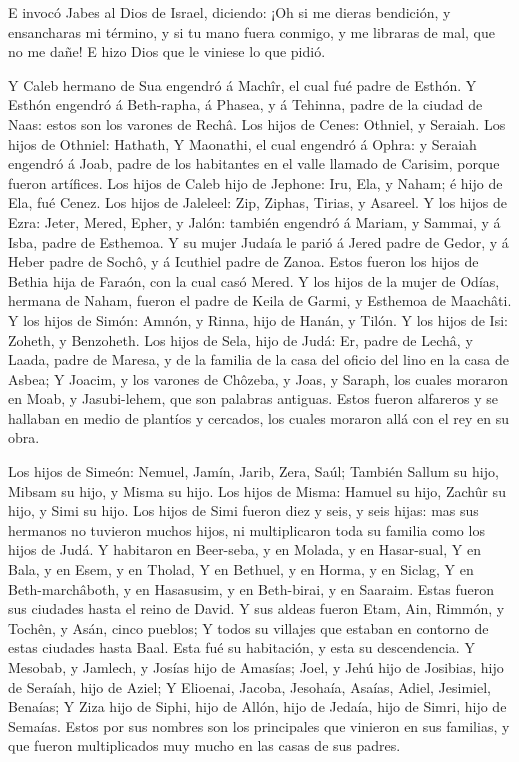  E invocó Jabes al Dios de Israel, diciendo: ¡Oh si me
dieras bendición, y ensancharas mi término, y si tu mano fuera conmigo,
y me libraras de mal, que no me dañe! E hizo Dios que le viniese lo que
pidió.

 Y Caleb hermano de Sua engendró á Machîr, el cual fué
padre de Esthón.  Y Esthón engendró á Beth-rapha, á Phasea,
y á Tehinna, padre de la ciudad de Naas: estos son los varones de Rechâ.
 Los hijos de Cenes: Othniel, y Seraiah. Los hijos de
Othniel: Hathath,  Y Maonathi, el cual engendró á Ophra: y
Seraiah engendró á Joab, padre de los habitantes en el valle llamado de
Carisim, porque fueron artífices.  Los hijos de Caleb hijo
de Jephone: Iru, Ela, y Naham; é hijo de Ela, fué Cenez. 
Los hijos de Jaleleel: Zip, Ziphas, Tirias, y Asareel.  Y
los hijos de Ezra: Jeter, Mered, Epher, y Jalón: también engendró á
Mariam, y Sammai, y á Isba, padre de Esthemoa.  Y su mujer
Judaía le parió á Jered padre de Gedor, y á Heber padre de Sochô, y á
Icuthiel padre de Zanoa. Estos fueron los hijos de Bethia hija de
Faraón, con la cual casó Mered.  Y los hijos de la mujer de
Odías, hermana de Naham, fueron el padre de Keila de Garmi, y Esthemoa
de Maachâti.  Y los hijos de Simón: Amnón, y Rinna, hijo de
Hanán, y Tilón. Y los hijos de Isi: Zoheth, y Benzoheth. 
Los hijos de Sela, hijo de Judá: Er, padre de Lechâ, y Laada, padre de
Maresa, y de la familia de la casa del oficio del lino en la casa de
Asbea;  Y Joacim, y los varones de Chôzeba, y Joas, y
Saraph, los cuales moraron en Moab, y Jasubi-lehem, que son palabras
antiguas.  Estos fueron alfareros y se hallaban en medio de
plantíos y cercados, los cuales moraron allá con el rey en su obra.

 Los hijos de Simeón: Nemuel, Jamín, Jarib, Zera, Saúl;
 También Sallum su hijo, Mibsam su hijo, y Misma su hijo.
 Los hijos de Misma: Hamuel su hijo, Zachûr su hijo, y Simi
su hijo.  Los hijos de Simi fueron diez y seis, y seis
hijas: mas sus hermanos no tuvieron muchos hijos, ni multiplicaron toda
su familia como los hijos de Judá.  Y habitaron en
Beer-seba, y en Molada, y en Hasar-sual,  Y en Bala, y en
Esem, y en Tholad,  Y en Bethuel, y en Horma, y en Siclag,
 Y en Beth-marchâboth, y en Hasasusim, y en Beth-birai, y
en Saaraim. Estas fueron sus ciudades hasta el reino de David.
 Y sus aldeas fueron Etam, Ain, Rimmón, y Tochên, y Asán,
cinco pueblos;  Y todos su villajes que estaban en contorno
de estas ciudades hasta Baal. Esta fué su habitación, y esta su
descendencia.  Y Mesobab, y Jamlech, y Josías hijo de
Amasías;  Joel, y Jehú hijo de Josibias, hijo de Seraíah,
hijo de Aziel;  Y Elioenai, Jacoba, Jesohaía, Asaías,
Adiel, Jesimiel, Benaías;  Y Ziza hijo de Siphi, hijo de
Allón, hijo de Jedaía, hijo de Simri, hijo de Semaías. 
Estos por sus nombres son los principales que vinieron en sus familias,
y que fueron multiplicados muy mucho en las casas de sus padres.

